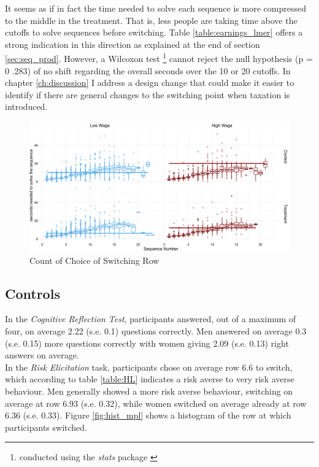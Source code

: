 It seems as if in fact the time needed to solve each sequence is more compressed to the middle in the treatment. That is, less people are taking time above the cutoffs to solve sequences before switching. Table \ref{table:earnings_lmer} offers a strong indication in this direction as explained at the end of section \ref{sec:seq_prod}. However, a Wilcoxon test \footnote{conducted using the \textit{stats} package \cite{rcoreteam2014}} cannot reject the null hypothesis (p = 0 .283) of no shift regarding the overall seconds over the 10 or 20 cutoffs. In chapter \ref{ch:discussion} I address a design change that could make it easier to identify if there are general changes to the switching point when taxation is introduced.\\

\begin{figure}
    \centering
    \includegraphics[width=\textwidth]{graphs/time_task_grid.png}
    \caption{Count of Choice of Switching Row}
    \label{fig:time_per_task}
\end{figure}

\subsection{Controls}

In the \textit{Cognitive Reflection Test}, participants answered, out of a maximum of four, on average 2.22 (s.e. 0.1) questions correctly. Men answered on average 0.3 (s.e. 0.15) more questions correctly with women giving 2.09 (s.e. 0.13) right answers on average.\\

In the \textit{Risk Elicitation} task, participants chose on average row 6.6 to switch, which according to table \ref{table:HL} indicates a risk averse to very risk averse behaviour. Men generally showed a more risk averse behaviour, switching on average at row 6.93 (s.e. 0.32), while women switched on average already at row 6.36 (s.e. 0.33). Figure \ref{fig:hist_mpl} shows a histogram of the row at which participants switched.\\

